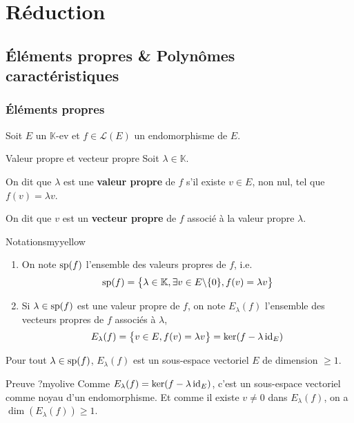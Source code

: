 \section{Réduction}

\subsection{Éléments propres \& Polynômes caractéristiques}

    \subsubsection{Éléments propres}

    Soit $E$ un $\mathbb{K}$-ev et $f \in \mathcal{L}(E)$ un endomorphisme de $E$.

    \begin{defi}{Valeur propre et vecteur propre}{}
        Soit $\lambda \in \mathbb{K}$. 

        On dit que $\lambda$ est une \textbf{valeur propre} de $f$ s’il existe $v \in E$, non nul, tel que $f(v) = \lambda v$.

        On dit que $v$ est un \textbf{vecteur propre} de $f$ associé à la valeur propre $\lambda$.
    \end{defi}

    \begin{omed}{Notations}{myyellow}
        \begin{enumerate}[label=\textcolor{myyellow}{\arabic*.}]
            \item On note $\sp(f)$ l’ensemble des valeurs propres de $f$, i.e.
            \[ \sp(f) = \big\{ \lambda \in \mathbb{K}, \exists v \in E \backslash \{0\} , f(v) = \lambda v \big\} \]    
            \item Si $\lambda \in \sp(f)$ est une valeur propre de $f$, on note $E_{\lambda}(f)$ l’ensemble des vecteurs propres de $f$ associés à $\lambda$, 
            \[ E_{\lambda} (f) = \big\{ v \in E, f(v) = \lambda v \big\} = \ker(f - \lambda \id_E) \]
        \end{enumerate}
    \end{omed}

    \begin{prop}{}{}
        Pour tout $\lambda \in \sp(f)$, $E_{\lambda}(f)$ est un sous-espace vectoriel $E$ de dimension $\geq 1$.
    \end{prop}

    \begin{demo}{Preuve ?}{myolive}
        Comme $E_{\lambda}(f) = \ker(f - \lambda \id_E)$, c’est un sous-espace vectoriel comme noyau d’un endomorphisme. Et comme il existe $v \neq 0$ dans $E_{\lambda}(f)$, on a $\dim(E_{\lambda}(f)) \geq 1$.
    \end{demo}

